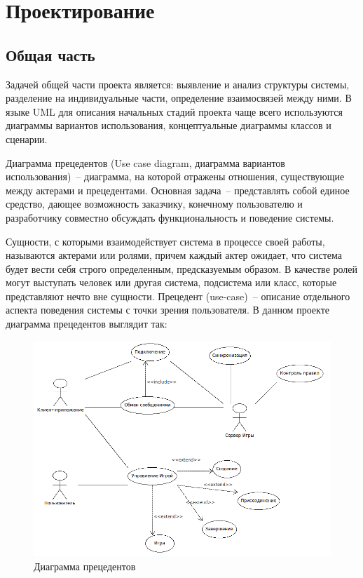 ﻿\section{Проектирование}
\subsection{Общая часть}
Задачей общей части проекта является: выявление и анализ структуры системы, разделение на индивидуальные части, определение взаимосвязей между ними. В языке UML для описания начальных стадий проекта чаще всего используются диаграммы вариантов использования, концептуальные диаграммы классов и сценарии. 

Диаграмма прецедентов (Use case diagram, диаграмма вариантов использования)~-- диаграмма, на которой отражены отношения, 
существующие между актерами и прецедентами.
Основная задача~-- представлять собой единое средство, дающее возможность заказчику, конечному пользователю и разработчику совместно
обсуждать функциональность и поведение системы.

Сущности, с которыми взаимодействует система в процессе своей работы, называются актерами или ролями, причем каждый актер ожидает, 
что система будет вести себя строго определенным, предсказуемым образом. В качестве ролей могут выступать человек или 
другая система, подсистема или класс, которые представляют нечто вне сущности.
Прецедент (use-case)~-- описание отдельного аспекта поведения системы с точки зрения пользователя.
В данном проекте диаграмма прецедентов выглядит так:

\begin{figure}[ht]
\centering
\includegraphics[width=18cm]{images/use.png}
\caption{Диаграмма прецедентов}
\label{fig0}
\end{figure}

